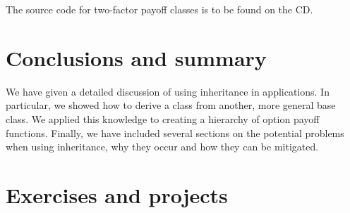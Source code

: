 The source code for two-factor payoff classes is to be found on the CD.

\section{Conclusions and summary}
We have given a detailed discussion of using inheritance in applications. In particular, we showed how to derive a class from another, more general base class. We applied this knowledge to creating a hierarchy of option payoff functions. Finally, we have included several sections on the potential problems when using inheritance, why they occur and how they can be mitigated.

\section{Exercises and projects}
